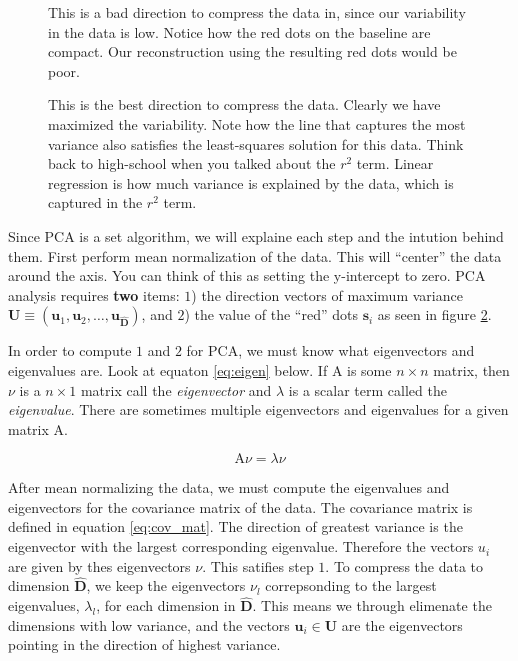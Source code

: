 \documentclass[11pt]{article}
\begin{document}
\begin{minipage}{0.47\linewidth}
  \begin{figure}[H]
    \centering
    
    \caption{This is a bad direction to compress the data in, since our variability in the data is low. Notice how the red dots on the baseline are compact. Our reconstruction using the resulting red dots would be poor.}
    \label{fig:pca_bad}
  \end{figure}
\end{minipage}\hfill
\begin{minipage}{0.47\linewidth}
  \begin{figure}[H]
    \centering
    
    \caption{This is the best direction to compress the data. Clearly we have maximized the variability. Note how the line that captures the most variance also satisfies the least-squares solution for this data. Think back to high-school when you talked about the $r^{2}$ term. Linear regression is how much variance is explained by the data, which is captured in the $r^{2}$ term.}
    \label{fig:pca_best}
  \end{figure}
\end{minipage}\vspace{0.5cm}

Since PCA is a set algorithm, we will explaine each step and the intution behind them. First perform mean normalization of the data. This will ``center'' the data around the axis. You can think of this as setting the y-intercept to zero. PCA analysis requires \textbf{two} items: $1$) the direction vectors of maximum variance $\mathbf{U} \equiv \left(\mathbf{u}_{1},\mathbf{u}_{2},\ldots,\mathbf{u}_{\mathbf{\hat{D}}}\right)$, and $2$) the value of the ``red'' dots $\mathbf{s}_{i}$ as seen in figure \ref{fig:pca_best}.

In order to compute $1$ and $2$ for PCA, we must know what eigenvectors and eigenvalues are. Look at equaton \ref{eq:eigen} below. If $\mathrm{A}$ is some $n \times n$ matrix, then $\nu$ is a $n \times 1$ matrix call the \emph{eigenvector} and $\lambda$ is a scalar term called the \emph{eigenvalue}. There are sometimes multiple eigenvectors and eigenvalues for a given matrix $\mathrm{A}$.

\begin{equation}\label{eq:eigen}
  \mathrm{A}\nu = \lambda\nu
\end{equation}

After mean normalizing the data, we must compute the eigenvalues and eigenvectors for the covariance matrix of the data. The covariance matrix is defined in equation \ref{eq:cov_mat}. The direction of greatest variance is the eigenvector with the largest corresponding eigenvalue. Therefore the vectors $u_{i}$ are given by thes eigenvectors $\nu$. This satifies step $1$. To compress the data to dimension $\mathbf{\hat{D}}$, we keep the eigenvectors $\nu_{l}$ correpsonding to the largest eigenvalues, $\lambda_{l}$, for each dimension in $\mathbf{\hat{D}}$. This means we through elimenate the dimensions with low variance, and the vectors $\mathbf{u}_{i} \in \mathbf{U}$ are the eigenvectors pointing in the direction of highest variance.
\end{document}
